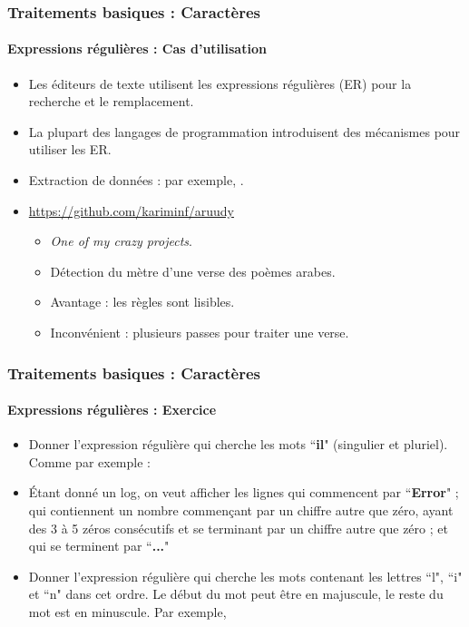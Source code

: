 \documentclass[xcolor=table]{beamer}
\begin{document}
\begin{frame}
\begin{minipage}{.38\textwidth}
\end{minipage}

\end{frame}

\begin{frame}
\frametitle{Traitements basiques : Caractères}
\framesubtitle{Expressions régulières : Cas d'utilisation}

\begin{itemize}
	\item Les éditeurs de texte utilisent les expressions régulières (ER) pour la recherche et le remplacement.
	\item La plupart des langages de programmation introduisent des mécanismes pour utiliser les ER.
	\item Extraction de données : par exemple, .
	\item \url{https://github.com/kariminf/aruudy}
	\begin{itemize}
		\item \textit{One of my crazy projects}.
		\item Détection du mètre d'une verse des poèmes arabes.
		\item Avantage : les règles sont lisibles.
		\item Inconvénient : plusieurs passes pour traiter une verse.
	\end{itemize}
\end{itemize}

\end{frame}


\begin{frame}
	\frametitle{Traitements basiques : Caractères}
	\framesubtitle{Expressions régulières : Exercice}
	
	\begin{itemize}
		\item Donner l'expression régulière qui cherche les mots ``\textbf{il}" (singulier et pluriel). 
		Comme par exemple : 
		\item Étant donné un log, on veut afficher les lignes qui commencent par ``\textbf{Error}" ; qui contiennent un nombre commençant par un chiffre autre que zéro, ayant des 3 à 5 zéros consécutifs et se terminant par un chiffre autre que zéro ; et qui se terminent par ``\textbf{...}"
		\item Donner l'expression régulière qui cherche les mots contenant les lettres ``l", ``i" et ``n" dans cet ordre. Le début du mot peut être en majuscule, le reste du mot est en minuscule. Par exemple, 
	\end{itemize}
	
\end{frame}
\end{document}

